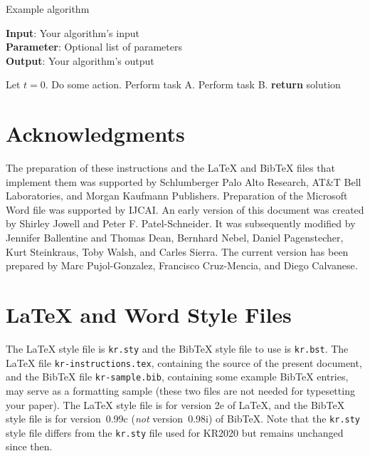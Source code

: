 \documentclass{article}
\begin{document}
\begin{algorithm}[tb]
\caption{Example algorithm}
\label{alg:algorithm}
\textbf{Input}: Your algorithm's input\\
\textbf{Parameter}: Optional list of parameters\\
\textbf{Output}: Your algorithm's output
\begin{algorithmic}[1] %
\STATE Let $t=0$.
\STATE Do some action.
\STATE Perform task A.
\ELSE
\STATE Perform task B.
\ENDIF
\ENDWHILE
\STATE \textbf{return} solution
\end{algorithmic}
\end{algorithm}

\section*{Acknowledgments}

The preparation of these instructions and the \LaTeX{} and Bib\TeX{}
files that implement them was supported by Schlumberger Palo Alto
Research, AT\&T Bell Laboratories, and Morgan Kaufmann Publishers.
Preparation of the Microsoft Word file was supported by IJCAI.  An
early version of this document was created by Shirley Jowell and Peter
F. Patel-Schneider.  It was subsequently modified by Jennifer
Ballentine and Thomas Dean, Bernhard Nebel, Daniel Pagenstecher,
Kurt Steinkraus, Toby Walsh, and Carles Sierra. The current version
has been prepared by Marc Pujol-Gonzalez, Francisco Cruz-Mencia, and Diego
Calvanese.

\appendix

\section{\LaTeX{} and Word Style Files}
\label{stylefiles}

The \LaTeX{} style file is \texttt{kr.sty} and the Bib\TeX{} style file to use
is \texttt{kr.bst}.  The \LaTeX{} file \texttt{kr-instructions.tex}, containing
the source of the present document, and the Bib\TeX{} file
\texttt{kr-sample.bib}, containing some example Bib\TeX{} entries, may serve as
a formatting sample (these two files are not needed for typesetting your
paper).  The \LaTeX{} style file is for version 2e of \LaTeX{}, and the
Bib\TeX{} style file is for version~0.99c (\emph{not} version~0.98i) of
Bib\TeX{}.  Note that the \texttt{kr.sty} style file differs from the
\texttt{kr.sty} file used for KR2020 but remains unchanged since then.
\end{document}
